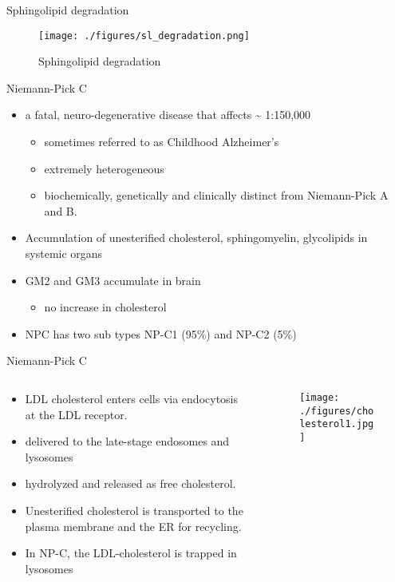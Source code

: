 \documentclass[presentation, smaller]{beamer}
\begin{document}
\begin{frame}[label={sec:orgheadline4}]{Sphingolipid degradation}
\begin{figure}[htb]
\centering
\texttt{[image: ./figures/sl\_degradation.png]}
\caption[deg]{\label{fig:sld}
Sphingolipid degradation}
\end{figure}
\end{frame}

\begin{frame}[label={sec:orgheadline5}]{Niemann-Pick C}
\begin{itemize}
\item a fatal, neuro-degenerative disease that affects \textasciitilde{} 1:150,000
\begin{itemize}
\item sometimes referred to as Childhood Alzheimer’s
\item extremely heterogeneous
\item biochemically, genetically and clinically distinct from Niemann-Pick A and B.
\end{itemize}
\item Accumulation of unesterified cholesterol, sphingomyelin, glycolipids in systemic organs
\item GM2 and GM3 accumulate in brain
\begin{itemize}
\item no increase in cholesterol
\end{itemize}
\item NPC has two sub types NP-C1 (95\%) and NP-C2 (5\%)
\end{itemize}
\end{frame}

\begin{frame}[label={sec:orgheadline6}]{Niemann-Pick C}
\begin{columns}
\begin{column}{0.5\columnwidth}
\begin{itemize}
\item LDL cholesterol enters cells via endocytosis at the LDL receptor.
\item delivered to the late-stage endosomes and lysosomes
\item hydrolyzed and released as free cholesterol.
\item Unesterified cholesterol is transported to the plasma membrane and the ER for recycling.

\item In NP-C, the LDL-cholesterol is trapped in lysosomes
\end{itemize}
\end{column}

\begin{column}{0.5\columnwidth}
\begin{figure}[htb]
\centering
\texttt{[image: ./figures/cholesterol1.jpg]}
\label{fig:}
\end{figure}
\end{column}
\end{columns}
\end{frame}
\end{document}

